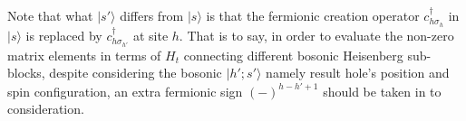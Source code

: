 \documentclass[eprint]{article} %
\begin{document}
Note that what $|s{'}\rangle$ differs from $|s\rangle$ is that the fermionic creation operator $c_{h\sigma_{h}}^{\dagger}$ in $|s\rangle$ is replaced by $c_{h\sigma_{h{'}}}^{\dagger}$ at site $h$. That is to say, in order to evaluate the non-zero matrix elements in terms of $H_{t}$ connecting different bosonic Heisenberg sub-blocks, despite considering the bosonic $|h{'}; s{'\rangle}$ namely result hole's position and spin configuration, an extra fermionic sign $(-)^{h-h{'}+1}$ should be taken in to consideration.

 

\end{document}
